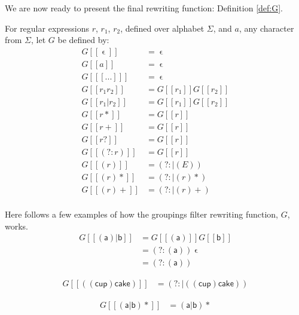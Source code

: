 We are now ready to present the final rewriting function: Definition
\vref{def:G}.
\begin{definition}
  \label{def:G}
  For regular expressions $r$, $r_1$, $r_2$, defined over alphabet
  $\Sigma$, and $a$, any character from $\Sigma$, let $G$ be defined by:
  \begin{align*}
    G[[\upvarepsilon]] &= \upvarepsilon \\
    G[[a]] &= \upvarepsilon \\
    G[[ [...] ]] &= \upvarepsilon \\
    G[[r_1r_2]] &= G[[r_1]]G[[r_2]] \\
    G[[r_1|r_2]] &= G[[r_1]]G[[r_2]] \\
    G[[r*]] &= G[[r]] \\
    G[[r+]] &= G[[r]] \\
    G[[r?]] &= G[[r]] \\
    G[[(?:r)]] &= G[[r]] \\
    G[[(r)]] &= (?:|(E)) \\
    G[[(r)*]] &= (?:|(r)*) \\
    G[[(r)+]] &= (?:|(r)+) \\
  \end{align*}
\end{definition}
\begin{example}
  Here follows a few examples of how the groupings filter rewriting
  function, $G$, works.
  \begin{align*}
    G[[\mathsf{(a)|b}]] &= G[[\mathsf{(a)}]]G[[\mathsf{b}]]\\
    &= \mathsf{(?:(a))} \upvarepsilon\\
    &= \mathsf{(?:(a))}
  \end{align*}

  \begin{align*}
    G[[\mathsf{((cup)cake)}]] &= \mathsf{(?:|((cup)cake))}
  \end{align*}

  \begin{align*}
    G[[\mathsf{(a|b)*}]] &= \mathsf{(a|b)*}
  \end{align*}
\end{example}

